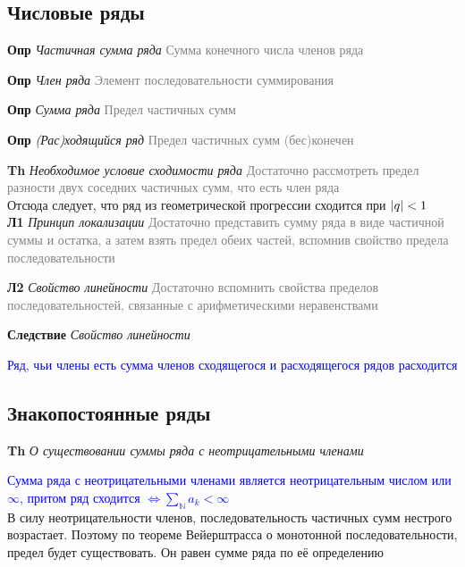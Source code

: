 \subsection{Числовые ряды}

\textbf{Опр} \textit{Частичная сумма ряда} \textcolor{gray}{Сумма конечного числа членов ряда}

\textbf{Опр} \textit{Член ряда} \textcolor{gray}{Элемент последовательности суммирования}

\textbf{Опр} \textit{Сумма ряда} \textcolor{gray}{Предел частичных сумм}

\textbf{Опр} \textit{(Рас)ходящийся ряд} \textcolor{gray}{Предел частичных сумм (бес)конечен}

\textbf{Th} \textit{Необходимое условие сходимости ряда} \textcolor{gray}{Достаточно рассмотреть предел
разности двух соседних частичных сумм, что есть член ряда} \\

Отсюда следует, что ряд из геометрической прогрессии сходится при $\abs{q} < 1$ \\

\textbf{Л1} \textit{Принцип локализации} \textcolor{gray}{Достаточно представить сумму ряда в виде частичной
суммы и остатка, а затем взять предел обеих частей, вспомнив свойство предела последовательности}

\textbf{Л2} \textit{Свойство линейности} \textcolor{gray}{Достаточно вспомнить свойства пределов
последовательностей, связанные с арифметическими неравенствами}

\textbf{Следствие} \textit{Свойство линейности}

\textcolor{blue}{Ряд, чьи члены есть сумма членов сходящегося и расходящегося рядов расходится}

\subsection{Знакопостоянные ряды}

\textbf{Th} \textit{О существовании суммы ряда с неотрицательными членами}

\textcolor{blue}{Сумма ряда с неотрицательными членами является неотрицательным числом или $\infty$, притом ряд
сходится $\Leftrightarrow \sum_{\mathbb{N}}^{}a_k < \infty$} \\

В силу неотрицательности членов, последовательность частичных сумм нестрого возрастает.
Поэтому по теореме Вейерштрасса о монотонной последовательности, предел будет существовать.
Он равен сумме ряда по её определению

